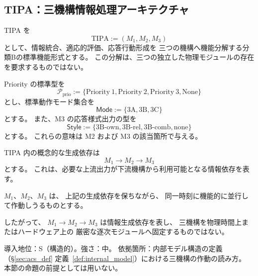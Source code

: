 \subsection{TIPA：三機構情報処理アーキテクチャ}
\label{subsec:tipa_architecture}

TIPA を
\[
  \mathrm{TIPA}:=(M_1,M_2,M_3)
\]
として、情報統合、適応的評価、応答行動形成を
三つの機構へ機能分解する分類Bの標準機能形式とする。
この分解は、三つの独立した物理モジュールの存在を要求するものではない。

Priority の標準型を
\[
  \mathcal P_{\mathrm{prio}}
  :=
  \{
    \mathrm{Priority\ 1},
    \mathrm{Priority\ 2},
    \mathrm{Priority\ 3},
    \mathrm{None}
  \}
\]
とし、標準動作モード集合を
\[
  \mathsf{Mode}
  :=
  \{\mathrm{3A},\mathrm{3B},\mathrm{3C}\}
\]
とする。
また、M3 の応答様式出力の型を
\[
  \mathsf{Style}
  :=
  \{\mathrm{3B\mbox{-}own},\mathrm{3B\mbox{-}rel},\mathrm{3B\mbox{-}comb},\mathrm{none}\}
\]
とする。
これらの意味は M2 および M3 の該当箇所で与える。

TIPA 内の概念的な生成依存は
\[
  M_1\longrightarrow M_2\longrightarrow M_3
\]
とする。
これは、必要な上流出力が下流機構から利用可能となる情報依存を表す。

\begin{assumption}[TIPA三機構の機能的並行性]
\label{ass:functional_concurrency}
$M_1$、$M_2$、$M_3$ は、
上記の生成依存を保ちながら、
同一時刻に機能的に並行して作動しうるものとする。

したがって、
$M_1\to M_2\to M_3$ は情報生成依存を表し、
三機構を物理時間上またはハードウェア上の
厳密な逐次モジュールへ固定するものではない。

導入地位：S（構造的）。強さ：中。
依拠箇所：内部モデル構造の定義（\S\ref{sec:acs_def} 定義~\ref{def:internal_model}）における三機構の作動の読み方。
本節の命題の前提としては用いない。
\end{assumption}

